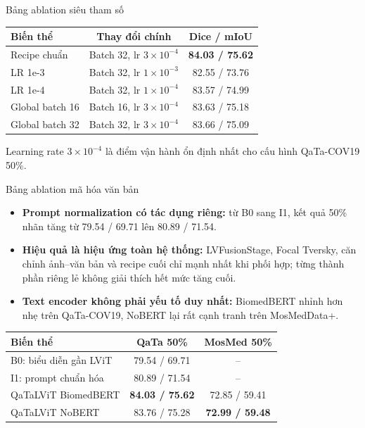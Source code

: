 \documentclass[aspectratio=169,11pt]{beamer}
\newcommand{\smallnote}[1]{%
  \par
  \vspace{0.12cm}
  {\footnotesize\color{ink}#1\par}
}
\begin{document}
\begin{frame}{Bảng ablation siêu tham số}
  \centering
  \small
  \renewcommand{\arraystretch}{1.18}
  \begin{tabular}{lcc}
    \toprule
    \textbf{Biến thể} & \textbf{Thay đổi chính} & \textbf{Dice / mIoU} \\
    \midrule
    Recipe chuẩn & Batch 32, lr \(3\times10^{-4}\) & \textbf{84.03 / 75.62} \\
    LR 1e-3 & Batch 32, lr \(1\times10^{-3}\) & 82.55 / 73.76 \\
    LR 1e-4 & Batch 32, lr \(1\times10^{-4}\) & 83.57 / 74.99 \\
    Global batch 16 & Batch 16, lr \(3\times10^{-4}\) & 83.63 / 75.18 \\
    Global batch 32 & Batch 32, lr \(3\times10^{-4}\) & 83.66 / 75.09 \\
    \bottomrule
  \end{tabular}
  \smallnote{Learning rate \(3\times10^{-4}\) là điểm vận hành ổn định nhất cho cấu hình QaTa-COV19 50\%.}
\end{frame}

\begin{frame}{Bảng ablation mã hóa văn bản}
  \begin{itemize}
    \item \textbf{Prompt normalization có tác dụng riêng:} từ B0 sang I1, kết quả 50\% nhãn tăng từ 79.54 / 69.71 lên 80.89 / 71.54.
    \item \textbf{Hiệu quả là hiệu ứng toàn hệ thống:} LVFusionStage, Focal Tversky, căn chỉnh ảnh--văn bản và recipe cuối chỉ mạnh nhất khi phối hợp; từng thành phần riêng lẻ không giải thích hết mức tăng cuối.
    \item \textbf{Text encoder không phải yếu tố duy nhất:} BiomedBERT nhỉnh hơn nhẹ trên QaTa-COV19, NoBERT lại rất cạnh tranh trên MosMedData+.
  \end{itemize}
  \vspace{0.10cm}
  \begin{center}
  \scriptsize
  \renewcommand{\arraystretch}{1.14}
  \begin{tabular}{lcc}
    \toprule
    \textbf{Biến thể} & \textbf{QaTa 50\%} & \textbf{MosMed 50\%} \\
    \midrule
    B0: biểu diễn gần LViT & 79.54 / 69.71 & -- \\
    I1: prompt chuẩn hóa & 80.89 / 71.54 & -- \\
    QaTaLViT BiomedBERT & \textbf{84.03 / 75.62} & 72.85 / 59.41 \\
    QaTaLViT NoBERT & 83.76 / 75.28 & \textbf{72.99 / 59.48} \\
    \bottomrule
  \end{tabular}
  \end{center}
\end{frame}
\end{document}
